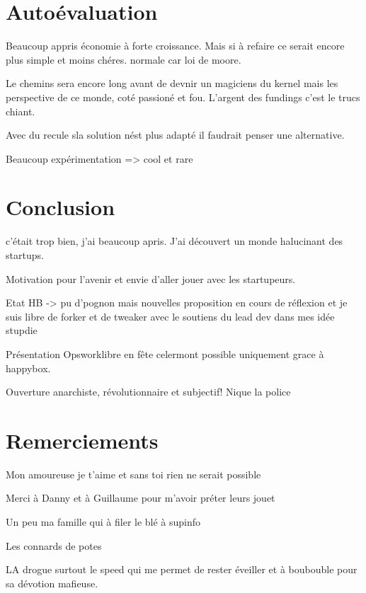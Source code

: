 \documentclass[11pt, a4paper ]{article}
\let\stdsection\section
\renewcommand\section{\newpage\stdsection}
\begin{document}
\begin{spacing}{1.5}


	\section{Autoévaluation} %

Beaucoup appris économie à forte croissance.
Mais si à refaire ce serait encore plus simple et moins chéres.
normale  car loi  de moore.

Le chemins sera encore long avant de devnir un magiciens du kernel mais les perspective de ce monde, coté passioné et fou. L'argent des fundings c'est le trucs chiant.

Avec du recule sla solution nést plus adapté il faudrait penser une alternative.

Beaucoup expérimentation => cool et rare

	\section{Conclusion} %

		c'était trop bien, j'ai beaucoup apris. J'ai découvert un monde halucinant des startups.

		Motivation pour l'avenir et envie d'aller jouer avec les startupeurs.

		Etat HB -> pu d'pognon mais nouvelles proposition en cours de réflexion et je suis libre de forker et de tweaker avec le soutiens du lead dev dans mes idée stupdie

		Présentation Opsworklibre en fête celermont possible uniquement grace à happybox.

		Ouverture anarchiste, révolutionnaire et subjectif! Nique la police


	\section{Remerciements}

		Mon amoureuse je t'aime et sans toi rien ne serait possible

		Merci à Danny et à Guillaume pour m'avoir préter leurs jouet

		Un peu ma famille qui à filer le blé à supinfo

		Les connards de potes

		LA drogue surtout le speed qui me permet de rester éveiller et à boubouble pour sa dévotion mafieuse.


	\appendix

\end{spacing}
\end{document}
